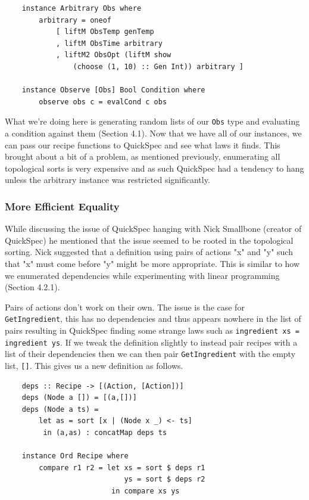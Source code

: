 \documentclass[11pt]{article}
\begin{document}
\begin{lstlisting}
    instance Arbitrary Obs where
        arbitrary = oneof
            [ liftM ObsTemp genTemp
            , liftM ObsTime arbitrary
            , liftM2 ObsOpt (liftM show
                (choose (1, 10) :: Gen Int)) arbitrary ]

    instance Observe [Obs] Bool Condition where
        observe obs c = evalCond c obs
\end{lstlisting}

What we're doing here is generating random lists of our \texttt{Obs} type
and evaluating a condition against them (Section 4.1). Now that we have
all of our instances, we can pass our recipe functions to QuickSpec and
see what laws it finds. This brought about a bit of a problem, as mentioned
previously, enumerating all topological sorts is very expensive and as such
QuickSpec had a tendency to hang unless the arbitrary instance was restricted
significantly.

\subsubsection{More Efficient Equality}

While discussing the issue of QuickSpec hanging with Nick Smallbone (creator of
QuickSpec) he mentioned that the issue seemed to be rooted in the topological sorting.
Nick suggested that a definition using pairs of actions "x" and "y" such that "x"
must come before "y" might be more appropriate. This is similar to how we enumerated
dependencies while experimenting with linear programming (Section 4.2.1).

\medbreak

Pairs of actions don't work on their own. The issue is the case for \texttt{GetIngredient},
this has no dependencies and thus appears nowhere in the list of pairs resulting in
QuickSpec finding some strange laws such as \texttt{ingredient xs = ingredient ys}.
If we tweak the definition slightly to instead pair recipes with a list of their dependencies
then we can then pair \texttt{GetIngredient} with the empty list, \texttt{[]}.
This gives us a new definition as follows.

\begin{lstlisting}
    deps :: Recipe -> [(Action, [Action])]
    deps (Node a []) = [(a,[])]
    deps (Node a ts) =
        let as = sort [x | (Node x _) <- ts]
         in (a,as) : concatMap deps ts

    instance Ord Recipe where
        compare r1 r2 = let xs = sort $ deps r1
                            ys = sort $ deps r2
                         in compare xs ys
\end{lstlisting}
\end{document}
